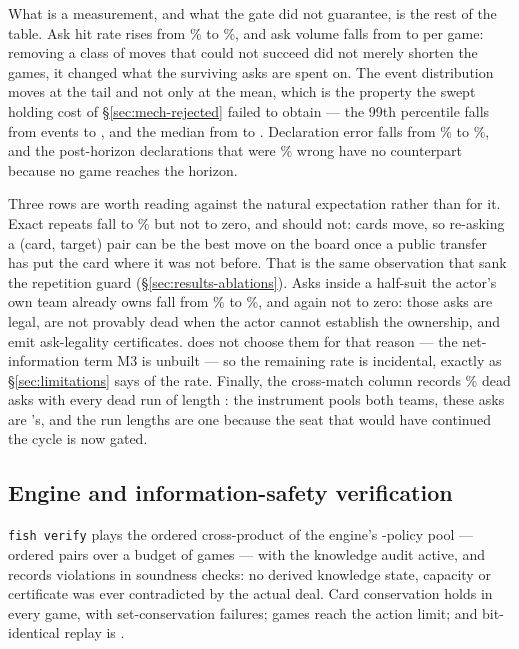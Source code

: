 What is a measurement, and what the gate did not guarantee, is the rest of the
table. Ask hit rate rises from \numFourHit\% to \numFiveHit\%, and ask volume
falls from \numFourAsks{} to \numFiveAsks{} per game: removing a class of moves
that could not succeed did not merely shorten the games, it changed what the
surviving asks are spent on. The event distribution moves at the tail and not
only at the mean, which is the property the swept holding cost of
\S\ref{sec:mech-rejected} failed to obtain --- the 99th percentile falls from
\numFourEventsPninetynine{} events to \numFiveEventsPninetynine{}, and the median
from \numFourEventsMedian{} to \numFiveEventsMedian{}. Declaration error falls
from \numFourDeclWrong\% to \numFiveDeclWrong\%, and the \numFourPostHorizonDecl{}
post-horizon declarations that were \numFourPostHorizonWrong\% wrong have no
counterpart because no game reaches the horizon.

Three rows are worth reading against the natural expectation rather than for it.
Exact repeats fall to \numFiveRepeatAsk\% but not to zero, and should not: cards
move, so re-asking a (card, target) pair can be the best move on the board once a
public transfer has put the card where it was not before. That is the same
observation that sank the repetition guard (\S\ref{sec:results-ablations}). Asks
inside a half-suit the actor's own team already owns fall from \numFourOwnLocked\%
to \numFiveOwnLocked\%, and again not to zero: those asks are legal, are not
provably dead when the actor cannot establish the ownership, and emit ask-legality
certificates. \vfive{} does not choose them for that reason --- the net-information
term M3 is unbuilt --- so the remaining rate is incidental, exactly as
\S\ref{sec:limitations} says of the \vfour{} rate. Finally, the cross-match column
records \numCrossDeadAsk\% dead asks with every dead run of length
\numCrossDeadRunLongest{}: the instrument pools both teams, these asks are
\vfour{}'s, and the run lengths are one because the seat that would have continued
the cycle is now gated.

\subsection{Engine and information-safety verification}
\label{sec:results-verify}

\texttt{fish verify} plays the ordered cross-product of the engine's
\numVerifyPool{}-policy pool --- \numVerifyPairs{} ordered pairs over a budget of
\numVerifyGames{} games --- with the knowledge audit active, and records
\numVerifyViolations{} violations in \numVerifyChecks{} soundness checks: no
derived knowledge state, capacity or certificate was ever contradicted by the
actual deal. Card conservation holds in every game, with \numVerifySetFail{}
set-conservation failures; \numVerifyLimitGames{} games reach the action limit;
and bit-identical replay is \numVerifyDeterminism{}.

